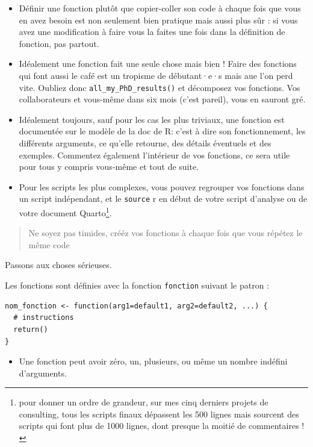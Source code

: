 \documentclass[
  letterpaper,
  DIV=11,
  numbers=noendperiod]{scrreprt}
\providecommand{\tightlist}{%
  \setlength{\itemsep}{0pt}\setlength{\parskip}{0pt}}\usepackage{longtable,booktabs,array}
\begin{document}
\begin{itemize}
\item
  Définir une fonction plutôt que copier-coller son code à chaque fois
  que vous en avez besoin est non seulement bien pratique mais aussi
  plus sûr : si vous avez une modification à faire vous la faites une
  fois dans la définition de fonction, pas partout.
\item
  Idéalement une fonction fait une seule chose mais bien ! Faire des
  fonctions qui font aussi le café est un tropisme de débutant·e·s mais
  aue l'on perd vite. Oubliez donc \texttt{all\_my\_PhD\_results()} et
  décomposez vos fonctions. Vos collaborateurs et vous-même dans six
  mois (c'est pareil), vous en sauront gré.
\item
  Idéalement toujours, sauf pour les cas les plus triviaux, une fonction
  est documentée sur le modèle de la doc de R: c'est à dire son
  fonctionnement, les différents arguments, ce qu'elle retourne, des
  détails éventuels et des exemples. Commentez également l'intérieur de
  vos fonctions, ce sera utile pour tous y compris vous-même et tout de
  suite.
\item
  Pour les scripts les plus complexes, vous pouvez regrouper vos
  fonctions dans un script indépendant, et le \texttt{source} r en début
  de votre script d'analyse ou de votre document Quarto\footnote{pour
    donner un ordre de grandeur, sur mes cinq derniers projets de
    consulting, tous les scripts finaux dépassent les 500 lignes mais
    sourcent des scripts qui font plus de 1000 lignes, dont presque la
    moitié de commentaires !}.
\end{itemize}

\begin{quote}
Ne soyez pas timides, crééz vos fonctions à chaque fois que vous répétez
le même code
\end{quote}

Passons aux choses sérieuses.

Les fonctions sont définies avec la fonction \texttt{fonction} suivant
le patron :

\begin{verbatim}
nom_fonction <- function(arg1=default1, arg2=default2, ...) {
  # instructions
  return()
}
\end{verbatim}

\begin{itemize}
\tightlist
\item
  Une fonction peut avoir zéro, un, plusieurs, ou même un nombre
  indéfini d'arguments.
\end{itemize}
\end{document}
